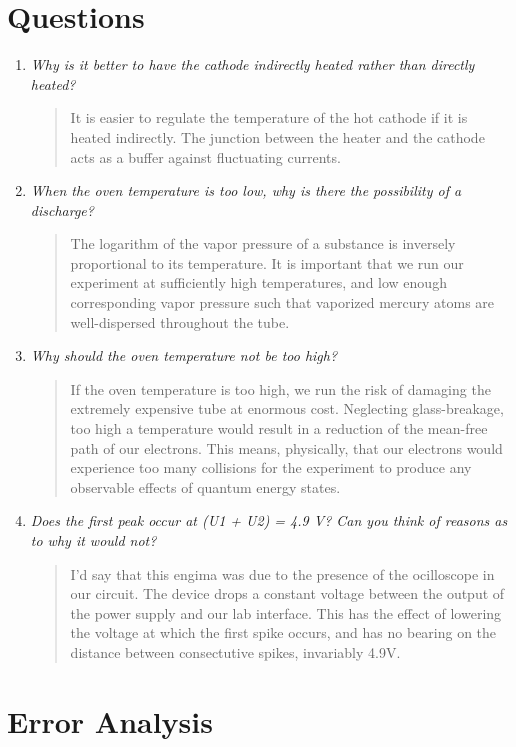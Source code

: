 \documentclass{amsart}
\begin{document}
\medskip

\pagebreak

\section{Questions}

\begin{enumerate}
\item {\textit{Why is it better to have the cathode indirectly heated rather than directly heated?}
\begin{quote}
It is easier to regulate the temperature of the hot cathode if it is heated indirectly. The junction between the heater and the cathode acts as a buffer against fluctuating currents.
\end{quote}}

\item{\textit{When the oven temperature is too low, why is there the possibility of a discharge?}
\begin{quote}
The logarithm of the vapor pressure of a substance is inversely proportional to its temperature. It is important that we run our experiment at sufficiently high temperatures, and low enough corresponding vapor pressure such that vaporized mercury atoms are well-dispersed throughout the tube.
\end{quote}}

\item{\textit{Why should the oven temperature not be too high?}
\begin{quote}
If the oven temperature is too high, we run the risk of damaging the extremely expensive tube at enormous cost. Neglecting glass-breakage, too high a temperature would result in a reduction of the mean-free path of our electrons. This means, physically, that our electrons would experience too many collisions for the experiment to produce any observable effects of quantum energy states.
\end{quote}}

\item{\textit{Does the first peak occur at (U1 + U2) = 4.9 V? Can you think of reasons as to why it would not?}
\begin{quote}
I'd say that this engima was due to the presence of the ocilloscope in our circuit. The device drops a constant voltage between the output of the power supply and our lab interface. This has the effect of lowering the voltage at which the first spike occurs, and has no bearing on the distance between consectutive spikes, invariably 4.9V.
\end{quote}}
\end{enumerate}

\section{Error Analysis}
\end{document}
